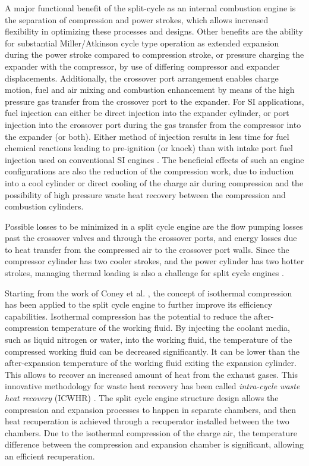 A major functional benefit of the split-cycle as an internal combustion engine is the separation of compression and power strokes, which allows increased flexibility in optimizing these processes and designs. Other benefits are the ability for substantial Miller/Atkinson cycle type operation as extended expansion during the power stroke compared to compression stroke, or pressure charging the expander with the compressor, by use of differing compressor and expander displacements. Additionally, the crossover port arrangement enables charge motion, fuel and air mixing and combustion enhancement by means of the high pressure gas transfer from the crossover port to the expander. For SI applications, fuel injection can either be direct injection into the expander cylinder, or port injection into the crossover port during the gas transfer from the compressor into the expander (or both). Either method of injection results in less time for fuel chemical reactions leading to pre-ignition (or knock) than with intake port fuel injection used on conventional SI engines \cite{Phillips2011a}. The beneficial effects of such an engine configurations are also the reduction of the compression work, due to induction into a cool cylinder or direct cooling of the charge air during compression and the possibility of high pressure waste heat recovery between the compression and combustion cylinders.

Possible losses to be minimized in a split cycle engine are the flow pumping losses past the crossover valves and through the crossover ports, and energy losses due to heat transfer from the compressed air to the crossover port walls. Since the compressor cylinder has two cooler strokes, and the power cylinder has two hotter strokes, managing thermal loading is also a challenge for split cycle engines \cite{Phillips2011a}. 

Starting from the work of Coney et al. \cite{Coney2004}, the concept of isothermal compression has been applied to the split cycle engine to further improve its efficiency capabilities. Isothermal compression has the potential to reduce the after-compression temperature of the working fluid. By injecting the coolant media, such as liquid nitrogen or water, into the working fluid, the temperature of the compressed working fluid can be decreased significantly. It can be lower than the after-expansion temperature of the working fluid exiting the expansion cylinder. This allows to recover an increased amount of heat from the exhaust gases. This innovative methodology for waste heat recovery has been called \emph{intra-cycle waste heat recovery} (ICWHR) \cite{Coney2004, Dong2015, Morgan2016}. The split cycle engine structure design allows the compression and expansion processes to happen in separate chambers, and then heat recuperation is achieved through a recuperator installed between the two chambers. Due to the isothermal compression of the charge air, the temperature difference between the compression and expansion chamber is significant, allowing an efficient recuperation.

